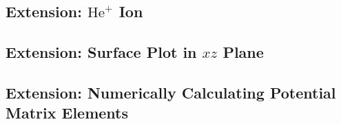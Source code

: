 \documentclass[]{article}
\begin{document}



\subsection{Extension: $\mathrm{He}^{+}$ Ion}
\label{sec:extens-he+-ion}


\subsection{Extension: Surface Plot in $xz$ Plane}
\label{sec:extens-surface-plot-xz}


\subsection{Extension: Numerically Calculating Potential Matrix Elements}
\label{sec:extens-numer-calc-potent}

\end{document}
